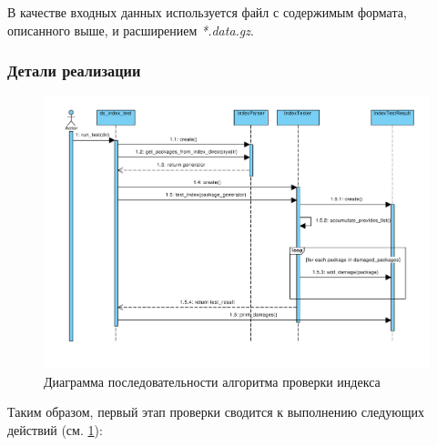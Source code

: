 В качестве входных данных используется файл с содержимым формата, описанного выше,
и расширением \textit{*.data.gz}.

\subsubsection{Детали реализации}
\begin{figure}[!ht]
\begin{center}
\includegraphics[scale=0.6, clip]{../resources/uml/SimpleTestCase.pdf}
\caption{Диаграмма последовательности алгоритма проверки индекса}
\label{gr:simple_test_case}
\end{center}
\end{figure}

Таким образом, первый этап проверки сводится к выполнению следующих действий (см. \ref{gr:simple_test_case}):

